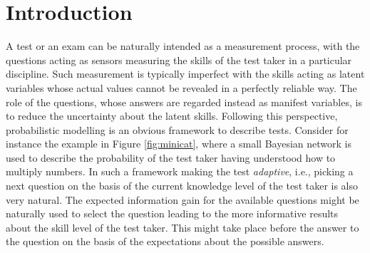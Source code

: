 \documentclass[runningheads]{llncs}
\begin{document}
\section{Introduction}\label{sec:intro}
A test or an exam can be naturally intended as a measurement process, with the questions acting as sensors measuring the skills of the test taker in a particular discipline. Such measurement is typically imperfect with the skills acting as latent variables whose actual values cannot be revealed in a perfectly reliable way. The role of the questions, whose answers are regarded instead as manifest variables, is to reduce the uncertainty about the latent skills. Following this perspective, probabilistic modelling is an obvious framework to describe tests. Consider for instance the example in Figure \ref{fig:minicat}, where a small Bayesian network is used to describe the probability of the test taker having understood how to multiply numbers. In such a framework making the test \emph{adaptive}, i.e., picking a next question on the basis of the current knowledge level of the test taker is also very natural. The expected information gain for the available questions might be naturally used to select the question leading to the more informative results about the skill level of the test taker. This might take place before the answer to the question on the basis of the expectations about the possible answers.
\end{document}
